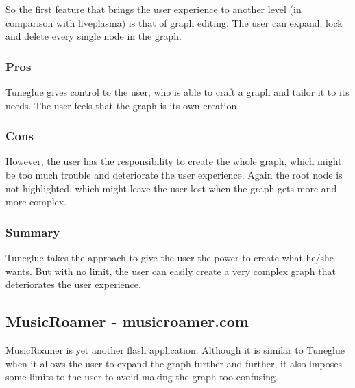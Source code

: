     So the first feature that brings the user experience to another level (in comparison with liveplasma) is that of graph editing.
    The user can expand, lock and delete every single node in the graph.


    \subsubsection{Pros} %
    \label{ssub:audiomap_pros}

      Tuneglue gives control to the user, who is able to craft a graph and tailor it to its needs.
      The user feels that the graph is its own creation.


    \subsubsection{Cons} %
    \label{ssub:audiomap_cons}

      However, the user has the responsibility to create the whole graph, which might be too much trouble and deteriorate the user experience.
      Again the root node is not highlighted, which might leave the user lost when the graph gets more and more complex.


    \subsubsection{Summary} %
    \label{ssub:audiomap_summary}

      Tuneglue takes the approach to give the user the power to create what he/she wants.
      But with no limit, the user can easily create a very complex graph that deteriorates the user experience.




  \subsection{MusicRoamer - musicroamer.com} %
  \label{sub:musicroamer}

    MusicRoamer is yet another flash application.
    Although it is similar to Tuneglue when it allows the user to expand the graph further and further, it also imposes some limits to the user to avoid making the graph too confusing.

